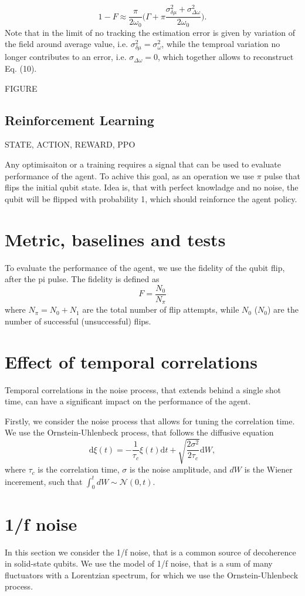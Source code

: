 \documentclass[aps,twocolumn,pra,notitlepage,]{revtex4-2}
\begin{document}
\begin{equation}
     1 - F \approx  \frac{\pi}{2\omega_0} \bigg(\Gamma + \pi\frac{\sigma^2_{\delta \mu} + \sigma^2_{\Delta\omega}}{2\omega_0}\bigg).
\end{equation}
Note that in the limit of no tracking  the estimation error is given by variation of the field around average value, i.e. $\sigma_{\delta \mu}^2 =  \sigma_{\omega}^2$, while the temproal variation no longer contributes to an error, i.e. $\sigma_{\Delta\omega} = 0$, which together allows to reconstruct Eq. (10).

FIGURE



\subsection{Reinforcement Learning}
STATE, ACTION, REWARD, PPO


Any optimisaiton or a training requires a signal that can be used to evaluate performance of the agent. To achive this goal, as an operation we use $\pi$ pulse that flips the initial qubit state. Idea is, that with perfect knowladge and no noise, the qubit will be flipped with probability 1, which should reinfornce the agent policy. 

\section{Metric, baselines and tests}

To evaluate the performance of the agent, we use the fidelity of the qubit flip, after the pi pulse. The fidelity is defined as
\begin{equation}
F = \frac{N_0}{N_\pi} 
\end{equation}
where $N_\pi =N_0 +N_1$ are the total number of flip attempts, while $N_0$ ($N_0$) are the number of successful (unsuccessful) flips. 

\section{Effect of temporal correlations}
Temporal correlations in the noise process, that extends behind a single shot time, can have a significant impact on the performance of the agent. 


Firstly, we consider the noise process that allows for tuning the correlation time. We use the Ornstein-Uhlenbeck process, that follows the diffusive equation
\begin{equation}
\text{d}\xi(t) = -\frac{1}{\tau_c} \xi(t) \text{d}t + \sqrt{\frac{2\sigma^2}{2\tau_c}}\text{d}W,
\end{equation}
where $\tau_c$ is the correlation time, $\sigma$ is the noise amplitude, and $dW$ is the Wiener incerement, such that $\int_0^t dW \sim \mathcal N(0,t)$. 



\section{1/f noise}
In this section we consider the 1/f noise, that is a common source of decoherence in solid-state qubits. We use the model of 1/f noise, that is a sum of many fluctuators with a Lorentzian spectrum, for which we use the Ornstein-Uhlenbeck process.
\end{document}
